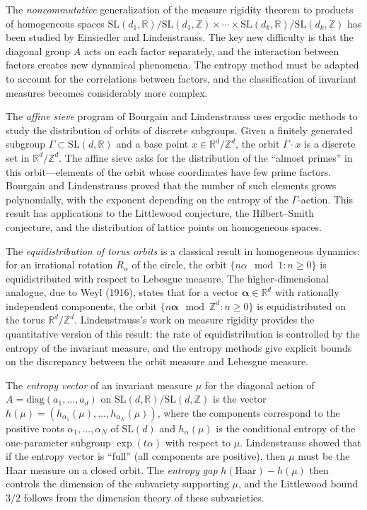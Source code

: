 The \emph{noncommutative} generalization of the measure rigidity theorem to products of homogeneous spaces $\text{SL}(d_1,\mathbb{R})/\text{SL}(d_1,\mathbb{Z}) \times \cdots \times \text{SL}(d_k,\mathbb{R})/\text{SL}(d_k,\mathbb{Z})$ has been studied by Einsiedler and Lindenstrauss. The key new difficulty is that the diagonal group $A$ acts on each factor separately, and the interaction between factors creates new dynamical phenomena. The entropy method must be adapted to account for the correlations between factors, and the classification of invariant measures becomes considerably more complex.

The \emph{affine sieve} program of Bourgain and Lindenstrauss uses ergodic methods to study the distribution of orbits of discrete subgroups. Given a finitely generated subgroup $\Gamma \subset \text{SL}(d,\mathbb{R})$ and a base point $x \in \mathbb{R}^d/\mathbb{Z}^d$, the orbit $\Gamma \cdot x$ is a discrete set in $\mathbb{R}^d/\mathbb{Z}^d$. The affine sieve asks for the distribution of the ``almost primes'' in this orbit---elements of the orbit whose coordinates have few prime factors. Bourgain and Lindenstrauss proved that the number of such elements grows polynomially, with the exponent depending on the entropy of the $\Gamma$-action. This result has applications to the Littlewood conjecture, the Hilbert--Smith conjecture, and the distribution of lattice points on homogeneous spaces.

The \emph{equidistribution of torus orbits} is a classical result in homogeneous dynamics: for an irrational rotation $R_\alpha$ of the circle, the orbit $\{n\alpha \mod 1 : n \ge 0\}$ is equidistributed with respect to Lebesgue measure. The higher-dimensional analogue, due to Weyl (1916), states that for a vector $\mathbf{\alpha} \in \mathbb{R}^d$ with rationally independent components, the orbit $\{n\mathbf{\alpha} \mod \mathbb{Z}^d : n \ge 0\}$ is equidistributed on the torus $\mathbb{R}^d/\mathbb{Z}^d$. Lindenstrauss's work on measure rigidity provides the quantitative version of this result: the rate of equidistribution is controlled by the entropy of the invariant measure, and the entropy methods give explicit bounds on the discrepancy between the orbit measure and Lebesgue measure.

The \emph{entropy vector} of an invariant measure $\mu$ for the diagonal action of $A = \text{diag}(a_1, \ldots, a_d)$ on $\text{SL}(d,\mathbb{R})/\text{SL}(d,\mathbb{Z})$ is the vector $h(\mu) = (h_{\alpha_1}(\mu), \ldots, h_{\alpha_N}(\mu))$, where the components correspond to the positive roots $\alpha_1, \ldots, \alpha_N$ of $\text{SL}(d)$ and $h_\alpha(\mu)$ is the conditional entropy of the one-parameter subgroup $\exp(t \alpha)$ with respect to $\mu$. Lindenstrauss showed that if the entropy vector is ``full'' (all components are positive), then $\mu$ must be the Haar measure on a closed orbit. The \emph{entropy gap} $h(\text{Haar}) - h(\mu)$ then controls the dimension of the subvariety supporting $\mu$, and the Littlewood bound $3/2$ follows from the dimension theory of these subvarieties.

